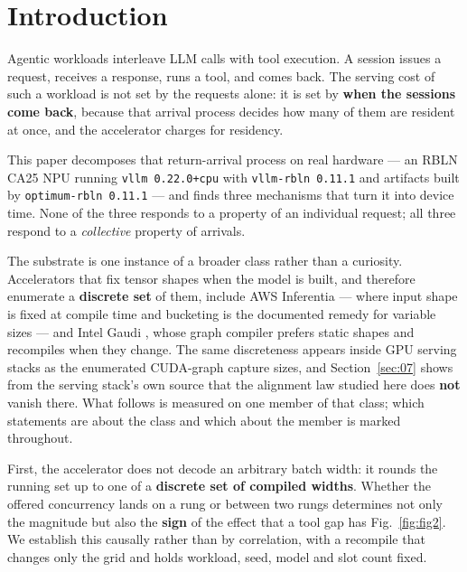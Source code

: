
\section{Introduction}
\label{sec:01}

Agentic workloads interleave LLM calls with tool execution. A session issues a request, receives a response, runs a tool, and comes back. The serving cost of such a workload is not set by the requests alone: it is set by \textbf{when the sessions come back}, because that arrival process decides how many of them are resident at once, and the accelerator charges for residency.

This paper decomposes that return-arrival process on real hardware --- an RBLN CA25 NPU running \texttt{vllm 0.22.0+cpu} with \texttt{vllm-rbln 0.11.1} and artifacts built by \texttt{optimum-rbln 0.11.1} --- and finds three mechanisms that turn it into device time. None of the three responds to a property of an individual request; all three respond to a \emph{collective} property of arrivals.

The substrate is one instance of a broader class rather than a curiosity. Accelerators that fix tensor shapes when the model is built, and therefore enumerate a \textbf{discrete set} of them, include AWS Inferentia \cite{neuronbucketing} --- where input shape is fixed at compile time and bucketing is the documented remedy for variable sizes --- and Intel Gaudi \cite{gaudishapes}, whose graph compiler prefers static shapes and recompiles when they change. The same discreteness appears inside GPU serving stacks as the enumerated CUDA-graph capture sizes, and Section~\ref{sec:07} shows from the serving stack's own source that the alignment law studied here does \textbf{not} vanish there. What follows is measured on one member of that class; which statements are about the class and which about the member is marked throughout.

First, the accelerator does not decode an arbitrary batch width: it rounds the running set up to one of a \textbf{discrete set of compiled widths}. Whether the offered concurrency lands on a rung or between two rungs determines not only the magnitude but also the \textbf{sign} of the effect that a tool gap has Fig.~\ref{fig:fig2}. We establish this causally rather than by correlation, with a recompile that changes only the grid and holds workload, seed, model and slot count fixed.


